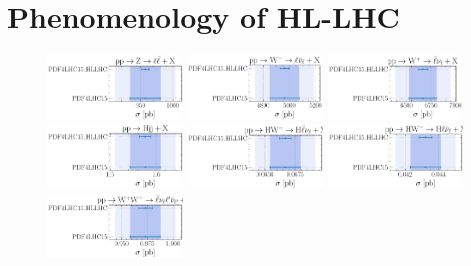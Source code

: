 \section{Phenomenology of HL-LHC}
\label{app:comparisons_with_HLLHC}

\begin{figure}[!h]
	\centering
	\includegraphics[width=0.32\textwidth]{plots/LHCpheno/NNPDF_DY_14TEV_40_PHENO-integrated-HLLHC.pdf}
	\includegraphics[width=0.32\textwidth]{plots/LHCpheno/NNPDF_WM_14TEV_40_PHENO-integrated-HLLHC.pdf}
	\includegraphics[width=0.32\textwidth]{plots/LHCpheno/NNPDF_WP_14TEV_40_PHENO-integrated-HLLHC.pdf}
	\includegraphics[width=0.32\textwidth]{plots/LHCpheno/NNPDF_HVBF_14TEV_40_PHENO-integrated-HLLHC.pdf}
	\includegraphics[width=0.32\textwidth]{plots/LHCpheno/NNPDF_HWP_14TEV_40_PHENO-integrated-HLLHC.pdf}
	\includegraphics[width=0.32\textwidth]{plots/LHCpheno/NNPDF_HWM_14TEV_40_PHENO-integrated-HLLHC.pdf}
	\includegraphics[width=0.32\textwidth]{plots/LHCpheno/NNPDF_WPWM_14TEV_40_PHENO-integrated-HLLHC.pdf}

\end{figure}
